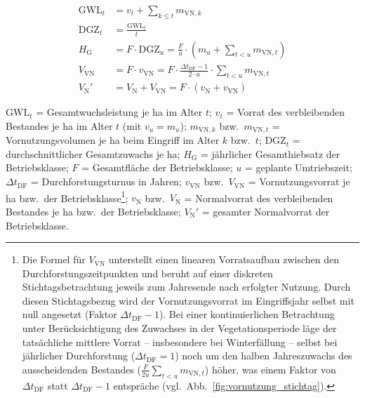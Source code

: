 \documentclass[twocolumn, paper=a4, fontsize=10pt]{scrartcl}
\begin{document}
\begin{equation}
  \begin{aligned}
    \text{GWL}_t &= v_t + \sum_{k \le t} m_{\text{VN},k} \\
    \text{DGZ}_t &= \frac{\text{GWL}_t}{t} \\
    H_{\text{G}} &= F \cdot \text{DGZ}_u = \frac{F}{u} \cdot \left(m_u + \sum_{t < u} m_{\text{VN},t}\right) \\
    V_{\text{VN}} &= F \cdot v_{\text{VN}} = F \cdot \frac{\Delta t_{\text{DF}} - 1}{2 \cdot u} \cdot \sum_{t < u} m_{\text{VN},t} \\
    V_{\text{N}}' &= V_{\text{N}} + V_{\text{VN}} = F \cdot (v_{\text{N}} + v_{\text{VN}})
  \end{aligned}
\end{equation}
{\footnotesize\noindent
  $\text{GWL}_t$ = Gesamtwuchsleistung je ha im Alter $t$; $v_t$ = Vorrat des verbleibenden Bestandes je ha im Alter $t$ (mit $v_u = m_u$); $m_{\text{VN},k}$ bzw.\ $m_{\text{VN},t}$ = Vornutzungsvolumen je ha beim Eingriff im Alter $k$ bzw.\ $t$; $\text{DGZ}_t$ = durchschnittlicher Gesamtzuwachs je ha; $H_{\text{G}}$ = jährlicher Gesamthiebsatz der Betriebsklasse; $F$ = Gesamtfläche der Betriebsklasse; $u$ = geplante Umtriebszeit; $\Delta t_{\text{DF}}$ = Durchforstungsturnus in Jahren; $v_{\text{VN}}$ bzw.\ $V_{\text{VN}}$ = Vornutzungsvorrat je ha bzw.\ der Betriebsklasse\footnote{Die Formel für $V_{\text{VN}}$ unterstellt einen linearen Vorratsaufbau zwischen den Durchforstungszeitpunkten und beruht auf einer diskreten Stichtagsbetrachtung jeweils zum Jahresende nach erfolgter Nutzung. Durch diesen Stichtagsbezug wird der Vornutzungsvorrat im Eingriffsjahr selbst mit null angesetzt (Faktor $\Delta t_{\text{DF}}-1$). Bei einer kontinuierlichen Betrachtung unter Berücksichtigung des Zuwachses in der Vegetationsperiode läge der tatsächliche mittlere Vorrat -- insbesondere bei Winterfällung -- selbst bei jährlicher Durchforstung ($\Delta t_{\text{DF}}=1$) noch um den halben Jahreszuwachs des ausscheidenden Bestandes ($\frac{F}{2u}\sum_{t < u} m_{\text{VN},t}$) höher, was einem Faktor von $\Delta t_{\text{DF}}$ statt $\Delta t_{\text{DF}}-1$ entspräche (vgl.\ Abb.~\ref{fig:vornutzung_stichtag}).}; $v_{\text{N}}$ bzw.\ $V_{\text{N}}$ = Normalvorrat des verbleibenden Bestandes je ha bzw.\ der Betriebsklasse; $V_{\text{N}}'$ = gesamter Normalvorrat der Betriebsklasse.\par}
\end{document}
